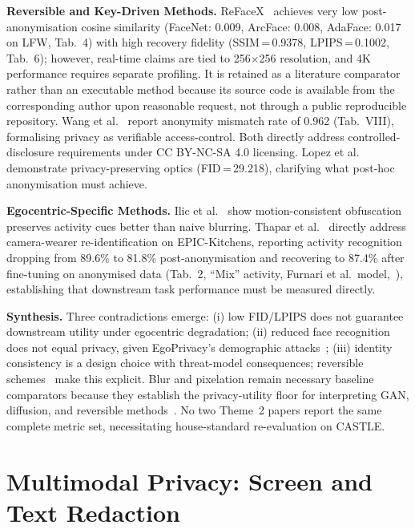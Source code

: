 \documentclass[10pt, twocolumn]{IEEEtran}
\begin{document}
\textbf{Reversible and Key-Driven Methods.} ReFaceX~\cite{muhammad2026refacex} achieves very low post-anonymisation cosine similarity (FaceNet: 0.009, ArcFace: 0.008, AdaFace: 0.017 on LFW, Tab.~4) with high recovery fidelity (SSIM\,=\,0.9378, LPIPS\,=\,0.1002, Tab.~6); however, real-time claims are tied to 256$\times$256 resolution, and 4K performance requires separate profiling. It is retained as a literature comparator rather than an executable method because its source code is available from the corresponding author upon reasonable request, not through a public reproducible repository. Wang et al.~\cite{zhang2025keydriven} report anonymity mismatch rate of 0.962 (Tab.~VIII), formalising privacy as verifiable access-control. Both directly address controlled-disclosure requirements under CC BY-NC-SA 4.0 licensing. Lopez et al.~\cite{lopez2024privacy} demonstrate privacy-preserving optics (FID\,=\,29.218), clarifying what post-hoc anonymisation must achieve.

\textbf{Egocentric-Specific Methods.} Ilic et al.~\cite{ilic2024selective} show motion-consistent obfuscation preserves activity cues better than naive blurring. Thapar et al.~\cite{thapar2021anonymizing} directly address camera-wearer re-identification on EPIC-Kitchens, reporting activity recognition dropping from 89.6\% to 81.8\% post-anonymisation and recovering to 87.4\% after fine-tuning on anonymised data (Tab.~2, ``Mix'' activity, Furnari et al.\ model,~\cite{thapar2021anonymizing}), establishing that downstream task performance must be measured directly.

\textbf{Synthesis.} Three contradictions emerge: (i) low FID/LPIPS does not guarantee downstream utility under egocentric degradation; (ii) reduced face recognition does not equal privacy, given EgoPrivacy's demographic attacks~\cite{li2025egoprivacy}; (iii) identity consistency is a design choice with threat-model consequences; reversible schemes~\cite{muhammad2026refacex,zhang2025keydriven} make this explicit. Blur and pixelation remain necessary baseline comparators because they establish the privacy-utility floor for interpreting GAN, diffusion, and reversible methods~\cite{khan2024survey,thapar2021anonymizing}. No two Theme~2 papers report the same complete metric set, necessitating house-standard re-evaluation on CASTLE.

\section{Multimodal Privacy: Screen and Text Redaction}
\label{sec:multimodal}
\end{document}
